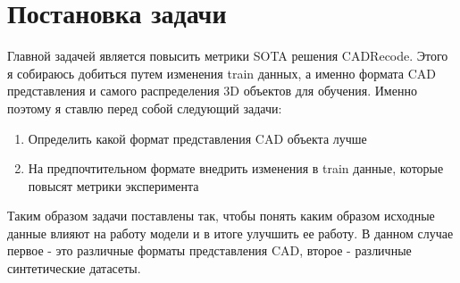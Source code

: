 \section{Постановка задачи}
\label{sec:Chapter1} 

Главной задачей является повысить метрики SOTA решения CADRecode. Этого я собираюсь добиться путем изменения train данных,
а именно формата CAD представления и самого распределения 3D объектов для обучения.
Именно поэтому я ставлю перед собой следующий задачи:
\begin{enumerate}
	\item Определить какой формат представления CAD объекта лучше
	\item На предпочтительном формате внедрить изменения в train данные, которые повысят метрики эксперимента
\end{enumerate}

Таким образом задачи поставлены так, чтобы понять каким образом исходные данные влияют на работу модели и в итоге улучшить ее работу.
В данном случае первое - это различные форматы представления CAD, второе - различные синтетические датасеты.

\newpage
